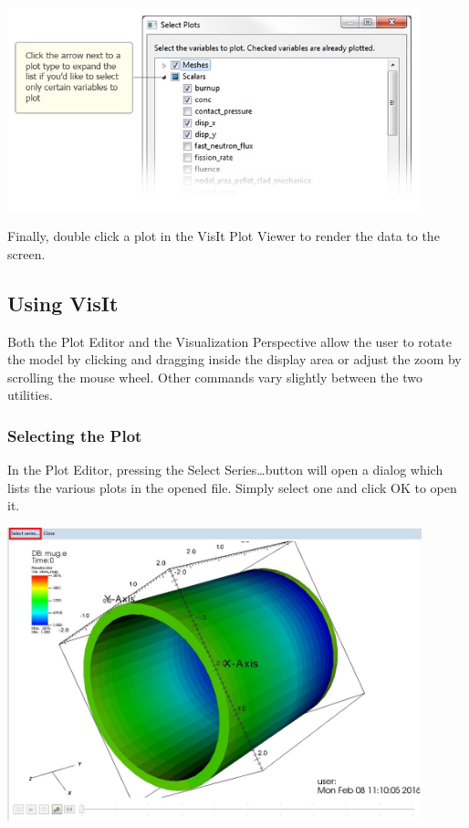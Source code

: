 \begin{center}
\includegraphics[width=12cm]{images/VisualizationSelectPlots}
\end{center}

Finally, double click a plot in the VisIt Plot Viewer to render the data to the
screen.

\subsection{Using VisIt}

Both the Plot Editor and the Visualization Perspective allow the user to rotate
the model by clicking and dragging inside the display area or adjust the zoom by
scrolling the mouse wheel. Other commands vary slightly between the two
utilities.

\subsubsection{Selecting the Plot}

In the Plot Editor, pressing the Select Series\ldots button will open a dialog
which lists the various plots in the opened file. Simply select one and click OK
to open it. 

\begin{center}
\includegraphics[width=12cm]{images/PlotEditorSelectSeriesButton}
\end{center}


